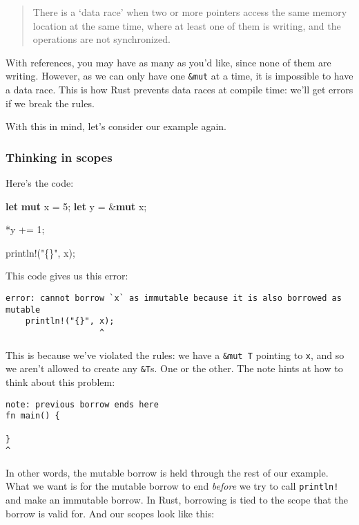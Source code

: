 \documentclass[a4paper,]{book}
\newenvironment{Shaded}{\begin{snugshade}}{\end{snugshade}}
\newcommand{\KeywordTok}[1]{\textcolor[rgb]{0.13,0.29,0.53}{\textbf{{#1}}}}
\newcommand{\DecValTok}[1]{\textcolor[rgb]{0.00,0.00,0.81}{{#1}}}
\newcommand{\StringTok}[1]{\textcolor[rgb]{0.31,0.60,0.02}{{#1}}}
\newcommand{\OtherTok}[1]{\textcolor[rgb]{0.56,0.35,0.01}{{#1}}}
\newcommand{\NormalTok}[1]{{#1}}
\begin{document}
\begin{quote}
There is a `data race' when two or more pointers access the same memory
location at the same time, where at least one of them is writing, and
the operations are not synchronized.
\end{quote}

With references, you may have as many as you'd like, since none of them
are writing. However, as we can only have one \texttt{\&mut} at a time,
it is impossible to have a data race. This is how Rust prevents data
races at compile time: we'll get errors if we break the rules.

With this in mind, let's consider our example again.

\subsubsection{Thinking in scopes}\label{thinking-in-scopes}

Here's the code:

\begin{Shaded}
\begin{Highlighting}[]
\KeywordTok{let} \KeywordTok{mut} \NormalTok{x = }\DecValTok{5}\NormalTok{;}
\KeywordTok{let} \NormalTok{y = &}\KeywordTok{mut} \NormalTok{x;}

\NormalTok{*y += }\DecValTok{1}\NormalTok{;}

\OtherTok{println!}\NormalTok{(}\StringTok{"\{\}"}\NormalTok{, x);}
\end{Highlighting}
\end{Shaded}

This code gives us this error:

\begin{verbatim}
error: cannot borrow `x` as immutable because it is also borrowed as mutable
    println!("{}", x);
                   ^
\end{verbatim}

This is because we've violated the rules: we have a \texttt{\&mut\ T}
pointing to \texttt{x}, and so we aren't allowed to create any
\texttt{\&T}s. One or the other. The note hints at how to think about
this problem:

\begin{verbatim}
note: previous borrow ends here
fn main() {

}
^
\end{verbatim}

In other words, the mutable borrow is held through the rest of our
example. What we want is for the mutable borrow to end \emph{before} we
try to call \texttt{println!} and make an immutable borrow. In Rust,
borrowing is tied to the scope that the borrow is valid for. And our
scopes look like this:
\end{document}
